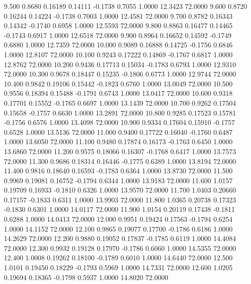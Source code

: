    9.500   0.8680   0.16189   0.14111  -0.1738   0.7055   1.0000  12.3423  72.0000
   9.600   0.8720   0.16244   0.14224  -0.1738   0.7003   1.0000  12.4581  72.0000
   9.700   0.8782   0.16343   0.14342  -0.1740   0.6958   1.0000  12.5593  72.0000
   9.800   0.8863   0.16477   0.14465  -0.1743   0.6917   1.0000  12.6518  72.0000
   9.900   0.8964   0.16652   0.14592  -0.1749   0.6880   1.0000  12.7359  72.0000
  10.000   0.9089   0.16888   0.14725  -0.1756   0.6846   1.0000  12.8107  72.0000
  10.100   0.9243   0.17222   0.14869  -0.1767   0.6817   1.0000  12.8762  72.0000
  10.200   0.9436   0.17713   0.15034  -0.1783   0.6793   1.0000  12.9310  72.0000
  10.300   0.9678   0.18447   0.15235  -0.1806   0.6773   1.0000  12.9744  72.0000
  10.400   0.9842   0.19106   0.15442  -0.1823   0.6760   1.0000  13.0049  72.0000
  10.500   0.9556   0.18394   0.15488  -0.1791   0.6743   1.0000  13.0417  72.0000
  10.600   0.9318   0.17701   0.15552  -0.1765   0.6697   1.0000  13.1439  72.0000
  10.700   0.9262   0.17504   0.15658  -0.1757   0.6630   1.0000  13.2891  72.0000
  10.800   0.9285   0.17523   0.15781  -0.1756   0.6576   1.0000  13.4098  72.0000
  10.900   0.9334   0.17604   0.15910  -0.1757   0.6528   1.0000  13.5136  72.0000
  11.000   0.9400   0.17722   0.16040  -0.1760   0.6487   1.0000  13.6050  72.0000
  11.100   0.9480   0.17874   0.16173  -0.1763   0.6450   1.0000  13.6860  72.0000
  11.200   0.9575   0.18066   0.16307  -0.1768   0.6417   1.0000  13.7573  72.0000
  11.300   0.9686   0.18314   0.16446  -0.1775   0.6389   1.0000  13.8194  72.0000
  11.400   0.9816   0.18640   0.16593  -0.1783   0.6364   1.0000  13.8730  72.0000
  11.500   0.9969   0.19081   0.16752  -0.1794   0.6344   1.0000  13.9183  72.0000
  11.600   1.0157   0.19709   0.16933  -0.1810   0.6326   1.0000  13.9570  72.0000
  11.700   1.0403   0.20660   0.17157  -0.1833   0.6311   1.0000  13.9903  72.0000
  11.800   1.0365   0.20738   0.17323  -0.1830   0.6301   1.0000  14.0117  72.0000
  11.900   1.0154   0.20119   0.17438  -0.1811   0.6288   1.0000  14.0413  72.0000
  12.000   0.9951   0.19424   0.17563  -0.1794   0.6254   1.0000  14.1152  72.0000
  12.100   0.9865   0.19077   0.17700  -0.1786   0.6186   1.0000  14.2629  72.0000
  12.200   0.9880   0.19052   0.17837  -0.1785   0.6119   1.0000  14.4084  72.0000
  12.300   0.9932   0.19128   0.17970  -0.1786   0.6060   1.0000  14.5355  72.0000
  12.400   1.0008   0.19262   0.18100  -0.1789   0.6010   1.0000  14.6440  72.0000
  12.500   1.0101   0.19450   0.18229  -0.1793   0.5969   1.0000  14.7331  72.0000
  12.600   1.0205   0.19694   0.18365  -0.1798   0.5937   1.0000  14.8020  72.0000
